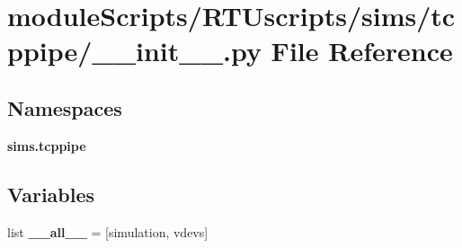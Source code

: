 \section{module\+Scripts/\+R\+T\+Uscripts/sims/tcppipe/\+\_\+\+\_\+init\+\_\+\+\_\+.py File Reference}
\label{sims_2tcppipe_2____init_____8py}
\subsection*{Namespaces}
\begin{DoxyCompactItemize}
\item 
 {\bf sims.\+tcppipe}
\end{DoxyCompactItemize}
\subsection*{Variables}
\begin{DoxyCompactItemize}
\item 
list {\bf \+\_\+\+\_\+all\+\_\+\+\_\+} = [\textquotesingle{}simulation\textquotesingle{}, \textquotesingle{}vdevs\textquotesingle{}]
\end{DoxyCompactItemize}
